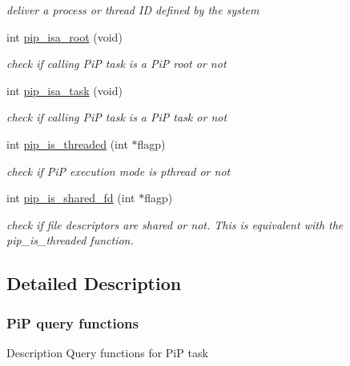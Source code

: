 \begin{DoxyCompactItemize}
\begin{DoxyCompactList}\small\item\em deliver a process or thread I\-D defined by the system \end{DoxyCompactList}\item 
int \hyperlink{group__PiP-4-query_ga6f1045bdbf682cb2ac504f09b57b73e9}{pip\-\_\-isa\-\_\-root} (void)
\begin{DoxyCompactList}\small\item\em check if calling Pi\-P task is a Pi\-P root or not \end{DoxyCompactList}\item 
int \hyperlink{group__PiP-4-query_gaf0283e47ad2d415206d6a3fa61e8a0a9}{pip\-\_\-isa\-\_\-task} (void)
\begin{DoxyCompactList}\small\item\em check if calling Pi\-P task is a Pi\-P task or not \end{DoxyCompactList}\item 
int \hyperlink{group__PiP-4-query_ga0455093d5040ae45585cc88a5f3f002b}{pip\-\_\-is\-\_\-threaded} (int $\ast$flagp)
\begin{DoxyCompactList}\small\item\em check if Pi\-P execution mode is pthread or not \end{DoxyCompactList}\item 
int \hyperlink{group__PiP-4-query_ga180ece8f3f537d84db8e70921f3ae099}{pip\-\_\-is\-\_\-shared\-\_\-fd} (int $\ast$flagp)
\begin{DoxyCompactList}\small\item\em check if file descriptors are shared or not. This is equivalent with the {\ttfamily pip\-\_\-is\-\_\-threaded} function. \end{DoxyCompactList}\end{DoxyCompactItemize}


\subsection{Detailed Description}
\hypertarget{pip-misc}{}\subsubsection{Pi\-P query functions}\label{pip-misc}
\begin{DoxyParagraph}{Description}
Query functions for Pi\-P task 
\end{DoxyParagraph}


